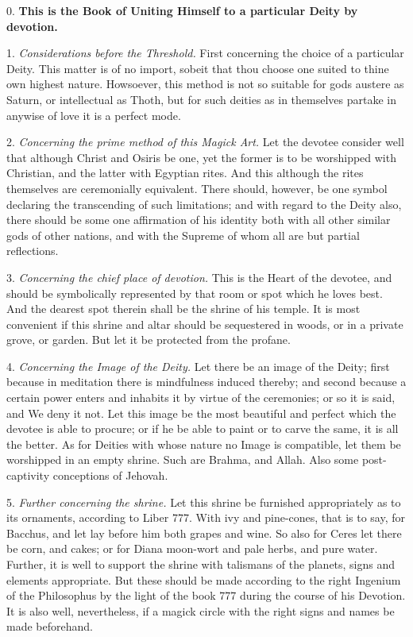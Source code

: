 

0. \textbf{This is the Book of Uniting Himself to a particular Deity by devotion.}

1. \textit{Considerations before the Threshold.} First concerning the choice of a particular Deity. This matter is of no import, sobeit that thou choose one suited to thine own highest nature. Howsoever, this method is not so suitable for gods austere as Saturn, or intellectual as Thoth, but for such deities as in themselves partake in anywise of love it is a perfect mode.

2. \textit{Concerning the prime method of this Magick Art.} Let the devotee consider well that although Christ and Osiris be one, yet the former is to be worshipped with Christian, and the latter with Egyptian rites. And this although the rites themselves are ceremonially equivalent. There should, however, be one symbol declaring the transcending of such limitations; and with regard to the Deity also, there should be some one affirmation of his identity both with all other similar gods of other nations, and with the Supreme of whom all are but partial reflections.

3. \textit{Concerning the chief place of devotion.} This is the Heart of the devotee, and should be symbolically represented by that room or spot which he loves best. And the dearest spot therein shall be the shrine of his temple. It is most convenient if this shrine and altar should be sequestered in woods, or in a private grove, or garden. But let it be protected from the profane.

4. \textit{Concerning the Image of the Deity.} Let there be an image of the Deity; first because in meditation there is mindfulness induced thereby; and second because a certain power enters and inhabits it by virtue of the ceremonies; or so it is said, and We deny it not. Let this image be the most beautiful and perfect which the devotee is able to procure; or if he be able to paint or to carve the same, it is all the better. As for Deities with whose nature no Image is compatible, let them be worshipped in an empty shrine. Such are Brahma, and Allah. Also some post-captivity conceptions of Jehovah.

5. \textit{Further concerning the shrine.} Let this shrine be furnished appropriately as to its ornaments, according to Liber 777. With ivy and pine-cones, that is to say, for Bacchus, and let lay before him both grapes and wine. So also for Ceres let there be corn, and cakes; or for Diana moon-wort and pale herbs, and pure water. Further, it is well to support the shrine with talismans of the planets, signs and elements appropriate. But these should be made according to the right Ingenium of the Philosophus by the light of the book 777 during the course of his Devotion. It is also well, nevertheless, if a magick circle with the right signs and names be made beforehand.

